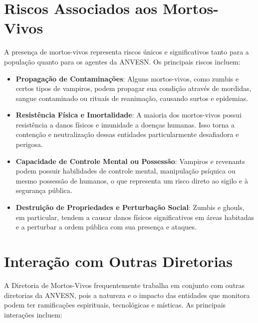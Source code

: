 \section{Riscos Associados aos Mortos-Vivos}
A presença de mortos-vivos representa riscos únicos e significativos tanto para a população quanto para os agentes da ANVESN. Os principais riscos incluem:

\begin{itemize}
    \item \textbf{Propagação de Contaminações}: Alguns mortos-vivos, como zumbis e certos tipos de vampiros, podem propagar sua condição através de mordidas, sangue contaminado ou rituais de reanimação, causando surtos e epidemias.
    \item \textbf{Resistência Física e Imortalidade}: A maioria dos mortos-vivos possui resistência a danos físicos e imunidade a doenças humanas. Isso torna a contenção e neutralização dessas entidades particularmente desafiadora e perigosa.
    \item \textbf{Capacidade de Controle Mental ou Possessão}: Vampiros e revenants podem possuir habilidades de controle mental, manipulação psíquica ou mesmo possessão de humanos, o que representa um risco direto ao sigilo e à segurança pública.
    \item \textbf{Destruição de Propriedades e Perturbação Social}: Zumbis e ghouls, em particular, tendem a causar danos físicos significativos em áreas habitadas e a perturbar a ordem pública com sua presença e ataques.
\end{itemize}

\section{Interação com Outras Diretorias}

A Diretoria de Mortos-Vivos frequentemente trabalha em conjunto com outras diretorias da ANVESN, pois a natureza e o impacto das entidades que monitora podem ter ramificações espirituais, tecnológicas e místicas. As principais interações incluem:

